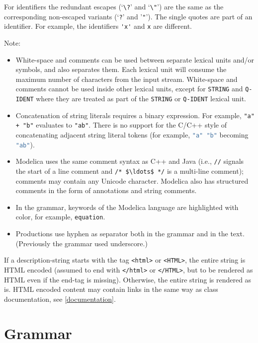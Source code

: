 For identifiers the redundant escapes (`\lstinline!\?!' and `\lstinline!\"!') are the same as the corresponding non-escaped variants (`\lstinline!?!' and '\lstinline!"!').
The single quotes are part of an identifier.
For example, the identifiers \lstinline!'x'! and \lstinline!x! are different.

Note:
\begin{itemize}
\item
  White-space and comments can be used between separate lexical units and/or symbols, and also separates them.
  Each lexical unit will consume the maximum number of characters from the input stream.
  White-space and comments cannot be used inside other lexical units, except for \lstinline[language=grammar]!STRING! and \lstinline[language=grammar]!Q-IDENT! where they are treated as part of the \lstinline[language=grammar]!STRING! or \lstinline[language=grammar]!Q-IDENT! lexical unit.
\item
  Concatenation of string literals requires a binary expression.
  For example, \lstinline!"a" + "b"! evaluates to \lstinline!"ab"!.
  There is no support for the C/C++ style of concatenating adjacent string literal tokens (for example, \lstinline[language=C]!"a" "b"! becoming \lstinline[language=C]!"ab"!).
\item
  Modelica uses the same comment syntax as C++ and Java (i.e., \lstinline!//! signals the start of a line comment and \lstinline!/* $\ldots$ */! is a multi-line comment); comments may contain any Unicode character.
  Modelica also has structured comments in the form of annotations and string comments.
\item
  In the grammar, keywords of the Modelica language are highlighted with color, for example, \lstinline[language=grammar]!equation!.
\item
  Productions use hyphen as separator both in the grammar and in the text.
  (Previously the grammar used underscore.)
\end{itemize}

If a description-string starts with the tag \lstinline!<html>! or \lstinline!<HTML>!, the entire string is HTML encoded (assumed to end with \lstinline!</html>! or \lstinline!</HTML>!, but to be rendered as HTML even if the end-tag is missing).
Otherwise, the entire string is rendered as is.
HTML encoded content may contain links in the same way as class documentation, see \cref{documentation}.


\section{Grammar}\label{grammar}

